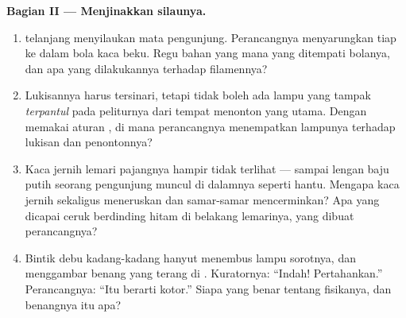 \begin{problem}
\medskip\noindent\textbf{Bagian II --- Menjinakkan silaunya.}
\begin{enumerate}[resume]
  \item {} telanjang menyilaukan mata pengunjung. Perancangnya
        menyarungkan tiap  ke dalam bola kaca beku. Regu bahan
        yang mana yang ditempati bolanya, dan apa yang dilakukannya
        terhadap  filamennya?
  \item Lukisannya harus tersinari, tetapi tidak boleh ada lampu yang
        tampak \emph{terpantul} pada peliturnya dari tempat menonton
        yang utama. Dengan memakai aturan , di mana
        perancangnya menempatkan lampunya terhadap lukisan dan
        penontonnya?
  \item Kaca jernih lemari pajangnya hampir tidak terlihat --- sampai
        lengan baju putih seorang pengunjung muncul di dalamnya
        seperti hantu. Mengapa kaca jernih sekaligus meneruskan dan
        samar-samar mencerminkan? Apa yang dicapai ceruk berdinding
        hitam di belakang lemarinya, yang dibuat perancangnya?
  \item Bintik debu kadang-kadang hanyut menembus  lampu
        sorotnya, dan menggambar benang yang terang di .
        Kuratornya: ``Indah! Pertahankan.'' Perancangnya: ``Itu
        berarti  kotor.'' Siapa yang benar tentang fisikanya,
        dan benangnya itu apa?
\end{enumerate}


\end{problem}
